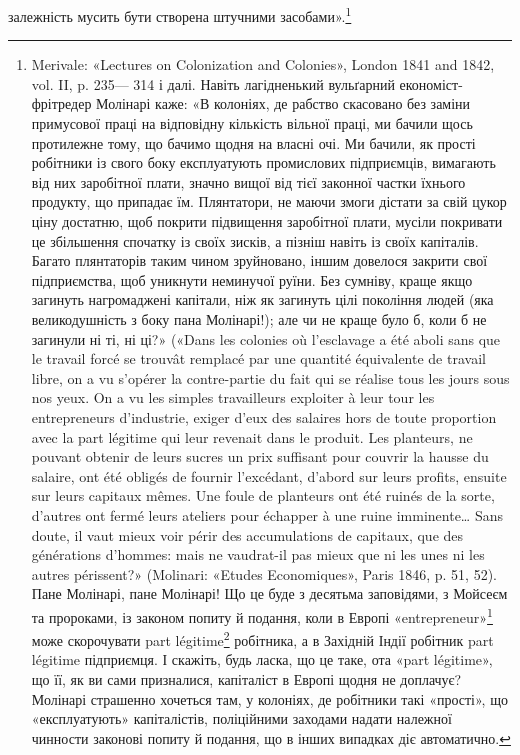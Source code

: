 залежність мусить бути створена штучними засобами».\footnote{
Merivale: «Lectures on Colonization and Colonies», London 1841 and 1842, vol. II, p. 235— 314 і
далі. Навіть лагідненький вульґарний економіст-фрітредер Молінарі каже: «В колоніях, де рабство
скасовано без заміни примусової праці на відповідну кількість вільної праці, ми бачили щось
протилежне тому, що бачимо щодня на власні очі. Ми
бачили, як прості робітники із свого боку експлуатують промислових підприємців, вимагають від них
заробітної плати, значно вищої від тієї законної частки їхнього продукту, що припадає їм.
Плянтатори, не маючи змоги дістати за свій цукор ціну достатню, щоб покрити підвищення заробітної
плати, мусіли покривати це збільшення спочатку із своїх зисків, а пізніш навіть із своїх капіталів.
Багато плянтаторів таким
чином зруйновано, іншим довелося закрити свої підприємства, щоб уникнути
неминучої руїни. Без сумніву, краще якщо загинуть нагромаджені капітали, ніж як загинуть цілі
покоління людей (яка великодушність з боку пана Молінарі!); але чи не краще було б, коли б не
загинули ні ті, ні ці?» («Dans les colonies où l’esclavage a été aboli sans que le travail forcé se
trouvât remplacé par une quantité équivalente de travail libre,
on a vu s’opérer la contre-partie du fait qui se réalise tous les jours sous nos yeux. On a vu les
simples travailleurs exploiter à leur tour les entrepreneurs d’industrie, exiger d’eux des salaires
hors de toute proportion avec la part légitime qui leur revenait dans le produit. Les planteurs, ne
pouvant obtenir de leurs sucres un prix suffisant pour couvrir la hausse du salaire, ont été obligés
de fournir l’excédant, d’abord sur leurs profits, ensuite sur leurs
capitaux mêmes. Une foule de planteurs ont été ruinés de la sorte, d’autres ont fermé leurs ateliers
pour échapper à une ruine imminente\dots{} Sans doute, il vaut mieux voir périr des accumulations de
capitaux, que des générations d'hommes: mais ne vaudrat-il pas mieux que ni les unes ni les autres périssent?» (Molinari: «Etudes Economiques», Paris 1846, p. 51, 52). Пане Молінарі,
пане Молінарі! Що це буде з десятьма заповідями, з Мойсеєм та пророками, із законом попиту й
подання, коли в Европі «entrepreneur»\footnote*{
— підприємець. \emph{Ред.}
} може скорочувати part légitime\footnote*{
— законну пайку. \emph{Ред.}
} робітника, а в Західній
Індії робітник part légitime підприємця. І скажіть, будь ласка, що це таке, ота «part légitime», що
її, як ви сами призналися, капіталіст
в Европі щодня не доплачує? Молінарі страшенно хочеться там, у колоніях, де робітники такі «прості»,
що «експлуатують» капіталістів, поліційними заходами надати належної чинности законові попиту й
подання, що в інших випадках діє автоматично.
}


